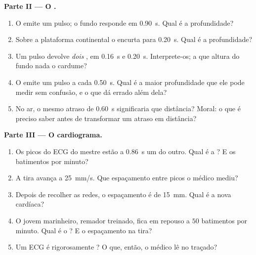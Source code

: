 \begin{problem}
\medskip
\noindent\textbf{Parte II --- O .}
\begin{enumerate}[resume]
  \item O  emite um pulso; o fundo responde em \qty{0.90}{s}. Qual é
        a profundidade?
  \item Sobre a plataforma continental o  encurta para \qty{0.20}{s}.
        Qual é a profundidade?
  \item Um pulso devolve \emph{dois} , em \qty{0.16}{s} e
        \qty{0.20}{s}. Interprete-os; a que altura do fundo nada o cardume?
  \item O  emite um pulso a cada \qty{0.50}{s}. Qual é a maior
        profundidade que ele pode medir sem confusão, e o que dá errado
        além dela?
  \item No ar, o mesmo atraso de \qty{0.60}{s} significaria que
        distância? Moral: o que é preciso saber antes de transformar um
        atraso em distância?
\end{enumerate}

\medskip
\noindent\textbf{Parte III --- O cardiograma.}
\begin{enumerate}[resume]
  \item Os picos do ECG do mestre estão a \qty{0.86}{s} um do outro. Qual
        é a ? E os batimentos por minuto?
  \item A tira avança a \qty{25}{mm/s}. Que espaçamento entre picos o
        médico mediu?
  \item Depois de recolher as redes, o espaçamento é de \qty{15}{mm}.
        Qual é a nova  cardíaca?
  \item O jovem marinheiro, remador treinado, fica em repouso a $50$
        batimentos por minuto. Qual é o ? E o espaçamento na tira?
  \item Um ECG é rigorosamente ? O que, então, o médico lê no
        traçado?
\end{enumerate}


\end{problem}
